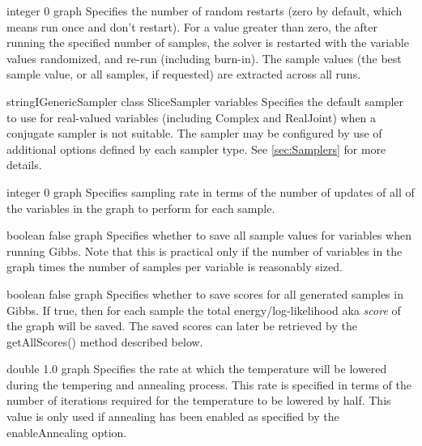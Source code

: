 
{integer}
{0}
{graph}
{Specifies the number of random restarts (zero by default, which means run once and don't restart). For a value greater than zero, the after running the specified number of samples, the solver is restarted with the variable values randomized, and re-run (including burn-in).  The sample values (the best sample value, or all samples, if requested) are extracted across all runs.
}


{\ifmatlab string\fi \ifjava IGenericSampler class\fi}
{SliceSampler}
{variables}
{Specifies the default sampler to use for real-valued variables (including Complex and RealJoint) when a conjugate sampler is not suitable. The sampler may be configured by use of additional options defined by each sampler type. See \autoref{sec:Samplers} for more details.}


{integer}
{0}
{graph}
{Specifies sampling rate in terms of the number of updates of all of the variables in the graph to perform for each sample.}



{boolean}
{false}
{graph}
{Specifies whether to save all sample values for variables when running Gibbs. Note that this is practical only if the number of variables in the graph times the number of samples per variable is reasonably sized.}


{boolean}
{false}
{graph}
{Specifies whether to save scores for all generated samples in Gibbs. If true, then for each sample the total energy/log-likelihood aka \emph{score} of the graph will be saved. The saved scores can later be retrieved by the getAllScores() method described below.}


{double}
{1.0}
{graph}
{Specifies the rate at which the temperature will be lowered during the tempering and annealing process. This rate is specified in terms of the number of iterations required for the temperature to be lowered by half. This value is only used if annealing has been enabled as specified by the enableAnnealing option.}

